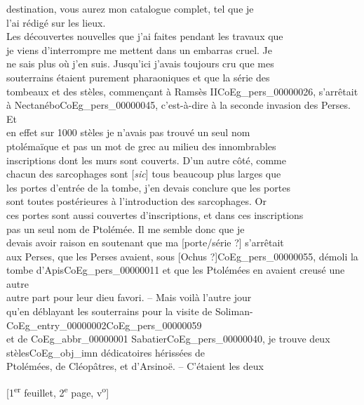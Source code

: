 \documentclass{book}
\begin{document}
destination, vous aurez mon catalogue complet, tel que je\\
l’ai rédigé sur les lieux.\\
\indent Les découvertes nouvelles que j’ai faites pendant les travaux que\\
je viens d’interrompre me mettent dans un embarras cruel. Je\\
ne sais plus où j’en suis. Jusqu’ici j’avais toujours cru que mes\\
souterrains étaient purement pharaoniques et que la série des\\
tombeaux et des stèles, commençant à Ramsès II\gls{CoEg_pers_00000026}, s’arrêtait\\
à Nectanébo\gls{CoEg_pers_00000045}, c’est-à-dire à la seconde invasion des Perses. Et\\
en effet sur 1000 stèles je n’avais pas trouvé un seul nom\\
ptolémaïque et pas un mot de grec au milieu des innombrables\\
inscriptions dont les murs sont couverts. D’un autre côté, comme\\
chacun des sarcophages sont {[\textit{sic}]} tous beaucoup plus larges que\\
les portes d’entrée de la tombe, j’en devais conclure que les portes\\
sont toutes postérieures à l’introduction des sarcophages. Or\\
ces portes sont aussi couvertes d’inscriptions, et dans ces inscriptions\\
pas un seul nom de Ptolémée. Il me semble donc que je\\
devais avoir raison en soutenant que ma {[porte/série ?]} s’arrêtait\\
aux Perses, que les Perses avaient, sous {[Ochus ?]}\gls{CoEg_pers_00000055}, démoli la\\
tombe d’Apis\gls{CoEg_pers_00000011} et que les Ptolémées en avaient creusé une autre\\
autre part pour leur dieu favori. – Mais voilà l’autre jour\\
qu’en déblayant les souterrains pour la visite de Soliman-\Gls{CoEg_entry_00000002}\gls{CoEg_pers_00000059}\\
et de \gls{CoEg_abbr_00000001} Sabatier\gls{CoEg_pers_00000040}, je trouve deux stèles\gls{CoEg_obj_imn} dédicatoires hérissées de\\
Ptolémées, de Cléopâtres, et d’Arsinoë. – C’étaient les deux
{\footnotesize\begin{center} {[1\textsuperscript{er} feuillet, 2\textsuperscript{e} page, v\textsuperscript{o}]}\end{center}}
\end{document}
